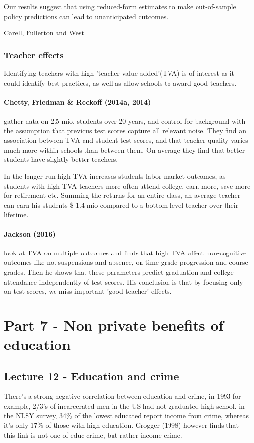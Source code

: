 \documentclass[12pt, a4paper]{article}
\begin{document}
\begin{multicols}{2}
\epigraph{Our results suggest that using reduced-form estimates to make out-of-sample policy predictions can lead to unanticipated outcomes.}{Carell, Fullerton and West }

\subsubsection{Teacher effects}
Identifying teachers with high 'teacher-value-added'(TVA) is of interest as it could identify best practices, as well as allow schools to award good teachers. 

\paragraph{Chetty, Friedman \& Rockoff (2014a, 2014)} gather data on 2.5 mio. students over 20 years, and control for background with the assumption that previous test scores capture all relevant noise. They find an association between TVA and student test scores, and that teacher quality varies much more within schools than between them. On average they find that better students have slightly better teachers. 

In the longer run high TVA increases students labor market outcomes, as students with high TVA teachers more often attend college, earn more, save more for retirement etc. Summing the returns for an entire class, an average teacher can earn his students \$ 1.4 mio compared to a bottom level teacher over their lifetime. 

\paragraph{Jackson (2016)} look at TVA on multiple outcomes and finds that high TVA affect non-cognitive outcomes like no. suspensions and absence, on-time grade progression and course grades. Then he shows that these parameters predict graduation and college attendance independently of test scores. His conclusion is that by focusing only on test scores, we miss important 'good teacher' effects. 


\section{Part 7 - Non private benefits of education}
\subsection{Lecture 12 - Education and crime}
There's a strong negative correlation between education and crime, in 1993 for example, 2/3's of incarcerated men in the US had not graduated high school. in the NLSY survey, 34\% of the lowest educated report income from crime, whereas it's only 17\% of those with high education. Grogger (1998) however finds that this link is not one of educ-crime, but rather income-crime. 


\end{multicols}
\end{document}
